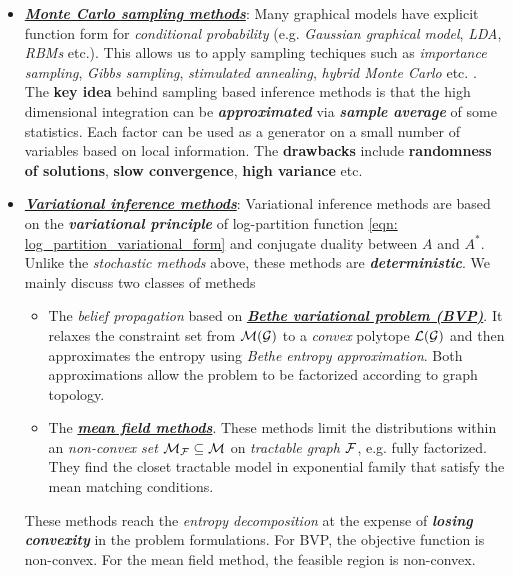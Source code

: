 \documentclass[11pt]{article}
\begin{document}
\begin{itemize}
\item \underline{\textbf{\emph{Monte Carlo sampling methods}}}: Many graphical models have explicit function form for \emph{conditional probability} (e.g. \emph{Gaussian graphical model}, \emph{LDA}, \emph{RBMs} etc.). This allows us to apply sampling techiques such as \emph{importance sampling}, \emph{Gibbs sampling}, \emph{stimulated annealing}, \emph{hybrid Monte Carlo} etc. \citep{liu2001monte, shapiro2003monte}. The \textbf{key idea} behind sampling based inference methods is that the high dimensional integration can be \emph{\textbf{approximated}} via \emph{\textbf{sample average}} of some statistics. Each factor can be used as a generator on a small number of variables based on local information. The \textbf{drawbacks} include \textbf{randomness of solutions}, \textbf{slow convergence}, \textbf{high variance} etc. 

\item \underline{\textbf{\emph{Variational inference methods}}}: Variational inference methods are based on the \textbf{\emph{variational principle}} of log-partition function \eqref{eqn: log_partition_variational_form} and conjugate duality between $A$ and $A^{*}$.  Unlike the \emph{stochastic methods} above, these methods are \textbf{\emph{deterministic}}. We mainly discuss two classes of metheds
\begin{itemize}
\item The \emph{belief propagation} based on \underline{\textbf{\emph{Bethe variational problem (BVP)}}}. It relaxes the constraint set from ${\mathcal M}({\mathcal G})$ to a \emph{convex} polytope ${\mathcal L}({\mathcal G})$ and then approximates the entropy using \emph{Bethe entropy approximation}. Both approximations allow the problem to be factorized according to graph topology. 

\item The \underline{\textbf{\emph{mean field methods}}}. These methods limit the distributions within an \emph{non-convex set} ${\mathcal M}_{{\mathcal F}} \subseteq {\mathcal M}$ on \emph{tractable graph} ${\mathcal F}$, e.g. fully factorized. They find the closet tractable model in exponential family that satisfy the mean matching conditions.
\end{itemize} These methods reach the \emph{entropy decomposition} at the expense of \textbf{\emph{losing convexity}} in the problem formulations. For BVP, the objective function is non-convex. For the mean field method, the feasible region is non-convex.  
\end{itemize}
\end{document}
